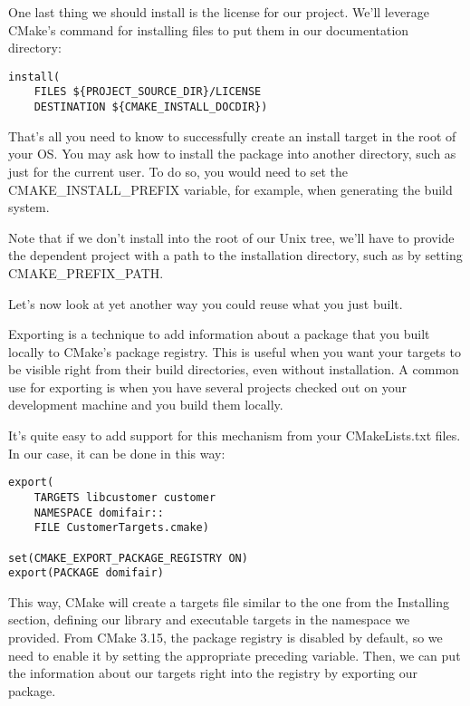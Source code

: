 One last thing we should install is the license for our project. We'll leverage CMake's command for installing files to put them in our documentation directory:

\begin{lstlisting}[style=styleCMake]
install(
	FILES ${PROJECT_SOURCE_DIR}/LICENSE
	DESTINATION ${CMAKE_INSTALL_DOCDIR})
\end{lstlisting}

That's all you need to know to successfully create an install target in the root of your OS. You may ask how to install the package into another directory, such as just for the current user. To do so, you would need to set the CMAKE\_INSTALL\_PREFIX variable, for example, when generating the build system.

Note that if we don't install into the root of our Unix tree, we'll have to provide the dependent project with a path to the installation directory, such as by setting CMAKE\_PREFIX\_PATH.

Let's now look at yet another way you could reuse what you just built.


Exporting is a technique to add information about a package that you built locally to CMake's package registry. This is useful when you want your targets to be visible right from their build directories, even without installation. A common use for exporting is when you have several projects checked out on your development machine and you build them locally.

It's quite easy to add support for this mechanism from your CMakeLists.txt files. In our case, it can be done in this way:

\begin{lstlisting}[style=styleCMake]
export(
	TARGETS libcustomer customer
	NAMESPACE domifair::
	FILE CustomerTargets.cmake)

set(CMAKE_EXPORT_PACKAGE_REGISTRY ON)
export(PACKAGE domifair)
\end{lstlisting}

This way, CMake will create a targets file similar to the one from the Installing section, defining our library and executable targets in the namespace we provided. From CMake 3.15, the package registry is disabled by default, so we need to enable it by setting the appropriate preceding variable. Then, we can put the information about our targets right into the registry by exporting our package.

